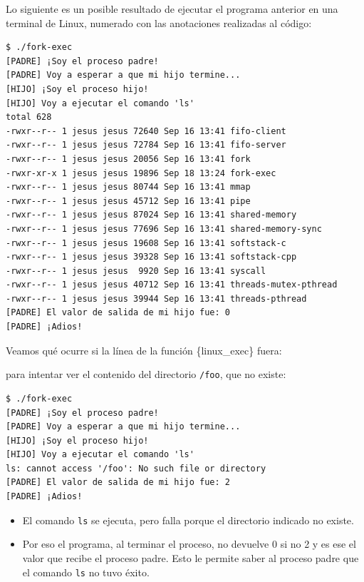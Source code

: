 Lo siguiente es un posible resultado de ejecutar el programa anterior en
una terminal de Linux, numerado con las anotaciones realizadas al
código:

\begin{verbatim}
$ ./fork-exec
[PADRE] ¡Soy el proceso padre!
[PADRE] Voy a esperar a que mi hijo termine...
[HIJO] ¡Soy el proceso hijo!
[HIJO] Voy a ejecutar el comando 'ls'
total 628 
-rwxr--r-- 1 jesus jesus 72640 Sep 16 13:41 fifo-client
-rwxr--r-- 1 jesus jesus 72784 Sep 16 13:41 fifo-server
-rwxr--r-- 1 jesus jesus 20056 Sep 16 13:41 fork
-rwxr-xr-x 1 jesus jesus 19896 Sep 18 13:24 fork-exec
-rwxr--r-- 1 jesus jesus 80744 Sep 16 13:41 mmap
-rwxr--r-- 1 jesus jesus 45712 Sep 16 13:41 pipe
-rwxr--r-- 1 jesus jesus 87024 Sep 16 13:41 shared-memory
-rwxr--r-- 1 jesus jesus 77696 Sep 16 13:41 shared-memory-sync
-rwxr--r-- 1 jesus jesus 19608 Sep 16 13:41 softstack-c
-rwxr--r-- 1 jesus jesus 39328 Sep 16 13:41 softstack-cpp
-rwxr--r-- 1 jesus jesus  9920 Sep 16 13:41 syscall
-rwxr--r-- 1 jesus jesus 40712 Sep 16 13:41 threads-mutex-pthread
-rwxr--r-- 1 jesus jesus 39944 Sep 16 13:41 threads-pthread
[PADRE] El valor de salida de mi hijo fue: 0 
[PADRE] ¡Adios!
\end{verbatim}

Veamos qué ocurre si la línea de la función \{linux\_exec\} fuera:

\begin{Shaded}
\begin{Highlighting}[]
\OperatorTok{(} \OperatorTok{,} \OperatorTok{,} \OperatorTok{,} \OperatorTok{,}\OperatorTok{);}
\end{Highlighting}
\end{Shaded}

para intentar ver el contenido del directorio \texttt{/foo}, que no
existe:

\begin{verbatim}
$ ./fork-exec
[PADRE] ¡Soy el proceso padre!
[PADRE] Voy a esperar a que mi hijo termine...
[HIJO] ¡Soy el proceso hijo!
[HIJO] Voy a ejecutar el comando 'ls'
ls: cannot access '/foo': No such file or directory 
[PADRE] El valor de salida de mi hijo fue: 2 
[PADRE] ¡Adios!
\end{verbatim}

\begin{itemize}
\item
  El comando \texttt{ls} se ejecuta, pero falla porque el directorio
  indicado no existe.
\item
  Por eso el programa, al terminar el proceso, no devuelve 0 si no 2 y
  es ese el valor que recibe el proceso padre. Esto le permite saber al
  proceso padre que el comando \texttt{ls} no tuvo éxito.
\end{itemize}


